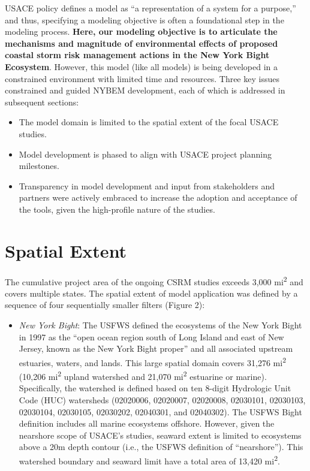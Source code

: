 \documentclass[
]{book}
\providecommand{\tightlist}{%
  \setlength{\itemsep}{0pt}\setlength{\parskip}{0pt}}
\begin{document}
USACE policy \citep{us_army_corps_of_engineers_assuring_2011} defines a model as ``a representation of a system for a purpose,'' and thus, specifying a modeling objective is often a foundational step in the modeling process. \textbf{Here, our modeling objective is to articulate the mechanisms and magnitude of environmental effects of proposed coastal storm risk management actions in the New York Bight Ecosystem}. However, this model (like all models) is being developed in a constrained environment with limited time and resources. Three key issues constrained and guided NYBEM development, each of which is addressed in subsequent sections:

\begin{itemize}
\item
  The model domain is limited to the spatial extent of the focal USACE studies.
\item
  Model development is phased to align with USACE project planning milestones.
\item
  Transparency in model development and input from stakeholders and partners were actively embraced to increase the adoption and acceptance of the tools, given the high-profile nature of the studies.
\end{itemize}

\hypertarget{spatial-extent}{%
\section{Spatial Extent}\label{spatial-extent}}

The cumulative project area of the ongoing CSRM studies exceeds 3,000 mi\textsuperscript{2} and covers multiple states. The spatial extent of model application was defined by a sequence of four sequentially smaller filters (Figure 2):

\begin{itemize}
\tightlist
\item
  \emph{New York Bight}: The USFWS defined the ecosystems of the New York Bight in 1997 as the ``open ocean region south of Long Island and east of New Jersey, known as the New York Bight proper'' and all associated upstream estuaries, waters, and lands. This large spatial domain covers 31,276 mi\textsuperscript{2} (10,206 mi\textsuperscript{2} upland watershed and 21,070 mi\textsuperscript{2} estuarine or marine). Specifically, the watershed is defined based on ten 8-digit Hydrologic Unit Code (HUC) watersheds (02020006, 02020007, 02020008, 02030101, 02030103, 02030104, 02030105, 02030202, 02040301, and 02040302). The USFWS Bight definition includes all marine ecosystems offshore. However, given the nearshore scope of USACE's studies, seaward extent is limited to ecosystems above a 20m depth contour (i.e., the USFWS definition of ``nearshore''). This watershed boundary and seaward limit have a total area of 13,420 mi\textsuperscript{2}.
\end{itemize}
\end{document}
